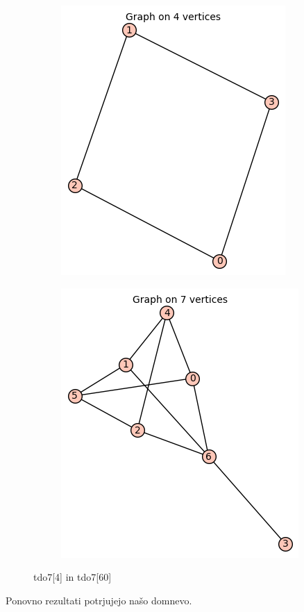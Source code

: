 \documentclass[12pt, a4paper]{article}
\begin{document}
\begin{center}
\begin{figure}[!htb]
\centering
\begin{subfigure}{0.5\textwidth}
  \centering
  \includegraphics[width=0.4\linewidth]{tdo7[4]}
\end{subfigure}%
\begin{subfigure}{0.5\textwidth}
  \centering
  \includegraphics[width=0.5\linewidth]{tdo7[60]}
\end{subfigure}
\caption{tdo7[4] in tdo7[60]}
\label{fig:test}
\end{figure}

\end{center}
Ponovno rezultati potrjujejo našo domnevo.
\clearpage
\end{document}
